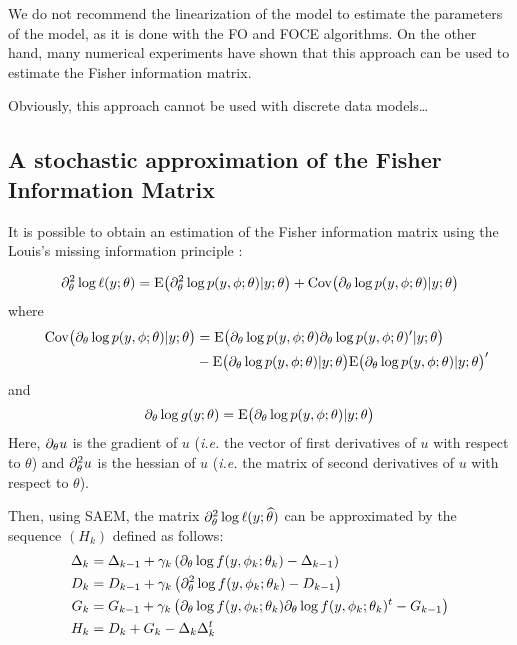  We do not recommend the linearization of
the model to estimate the parameters of the model, as it is done
with the FO and FOCE algorithms. On the other hand, many numerical
experiments have shown that this approach can be used to estimate
the Fisher information matrix.

 Obviously, this approach cannot be used with discrete data models\ldots

\subsection{A stochastic approximation of the Fisher Information Matrix}
It is possible to obtain an estimation of the Fisher information matrix using the Louis's missing
information principle \cite{loui82}:

\begin{equation}\label{louis}
\partial^2_\theta \log \ell(y;\theta) = \mathrm{E}\big(\partial^2_\theta \log p(y,{\phi}; \theta) | y ; \theta \big) +
\mathrm{Cov}\big(\partial_\theta \log p(y,{\phi};\theta)| y ; \theta \big)
\end{equation}
where
\begin{align*} \quad
\mathrm{Cov}\big(\partial_\theta \log p(y,{\phi};\theta)| y ; \theta \big) &=
\mathrm{E} \big(\partial_\theta \log p(y,{\phi}; \theta) \partial_\theta \log p(y,{\phi}; \theta)^\prime |y ; \theta \big)  \\
& -
\mathrm{E} \big( \partial_\theta \log p(y,{\phi}; \theta) |y ; \theta \big)\mathrm{E} \big( \partial_\theta \log p(y,{\phi}; \theta) |y ; \theta \big)^\prime
\end{align*}
and
$$\partial_\theta \log g(y;\theta) = \mathrm{E} \big( \partial_\theta \log p(y,{\phi}; \theta) |y ; \theta \big)$$
Here, $\partial_\theta u$ is the gradient of $u$ ({\it i.e.} the vector of first derivatives of $u$ with respect to $\theta$) and  $\partial^2_\theta u$ is the hessian of $u$ ({\it i.e.} the matrix of second derivatives of $u$ with respect to $\theta$).

Then, using SAEM, the matrix $\partial^2_\theta \log \ell (y;{\widehat{\theta}})$
can be approximated by the sequence $(H_k)$ defined as follows:
\begin{align*}
\Delta_k&=\Delta_{k-1}+\gamma_k\left(\partial_{\theta}\log
f(y,\phi_k;\theta_k)-\Delta_{k-1}\right)\\
D_k  &=   D_{k-1}   +   \gamma_k  \left( \partial^2_\theta \log  f (y,  \phi_k;
    \theta_k)   - D_{k-1} \right) \\
G_k  &=   G_{k-1}   +   \gamma_k  \left(  \partial_\theta \log f(y, \phi_k; \theta_k) \partial_\theta \log f(y, \phi_k; \theta_k)^t - G_{k-1} \right) \\
H_{k} &= D_k + G_k - \Delta_k \Delta_k^t
\end{align*}

